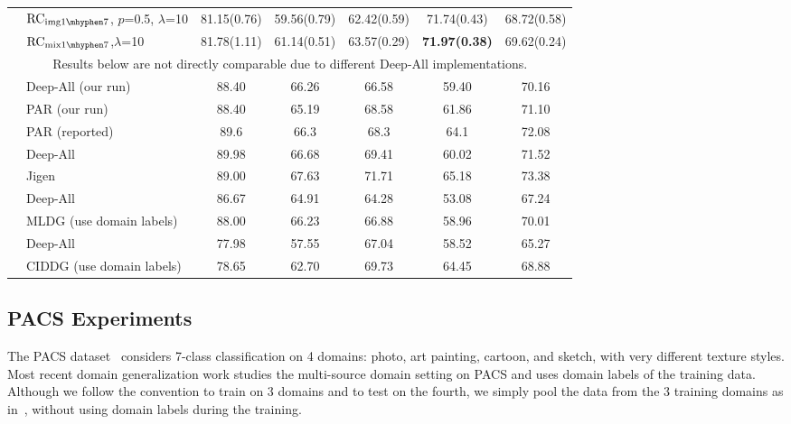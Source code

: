 \documentclass{article} \usepackage{iclr2021_conference,times}
\begin{document}
\begin{table}[t]
\begin{tabular}{c|lccccc}
		&$\text{RC}_{\text{img}{1\mhyphen7}}$\tiny, $p$=0.5, $\lambda$=10  & 81.15\tiny(0.76) & 59.56\tiny(0.79) & 62.42\tiny(0.59) & 71.74\tiny(0.43) & 68.72\tiny(0.58) \\	
		
		&$\text{RC}_{\text{mix}{1\mhyphen7}}$\tiny,$\lambda$=10 & 81.78\tiny(1.11) & 61.14\tiny(0.51) & 63.57\tiny(0.29) & \textbf{71.97\tiny(0.38)} & 69.62\tiny(0.24) \\

		
\midrule
		\multicolumn{7}{c}{{Results below are not directly comparable due to different Deep-All implementations.}} \\
		\midrule
		\multirow{3}{*}{\scriptsize	\citet{wang2019learning}} & Deep-All (our run) & 88.40 & 66.26 & 66.58 & 59.40 & 70.16 \\
		& PAR (our run) & 88.40 & 65.19 & 68.58  & 61.86 & 71.10 \\
		& PAR (reported) & 89.6 & 66.3 & 68.3 & 64.1 & 72.08 \\
\midrule
		\multirow{2}{*}{\scriptsize\citet{carlucci2019jigen}} & Deep-All & 89.98 & 66.68 & 69.41 & 60.02  & 71.52 \\
		& Jigen & 89.00 & 67.63& 71.71& 65.18 & 73.38 \\


		\midrule
		\multirow{2}{*}{\scriptsize\citet{li2018mldg}} & Deep-All &  86.67 & 64.91 & 64.28 & 53.08  & 67.24 \\
		& MLDG (\tiny use domain labels) & 88.00& 66.23 & 66.88 & 58.96  & 70.01 \\
\midrule
		\multirow{2}{*}{\scriptsize\citet{li2018ciddg}} & Deep-All& 77.98  &  57.55  & 67.04  & 58.52  & 65.27 \\
		& CIDDG (\tiny use domain labels)& 78.65 & 62.70 & 69.73 & 64.45  & 68.88 \\
		\bottomrule
	\end{tabular}
\end{table}

\subsection{PACS Experiments}

\label{section:PACS}
The PACS dataset~\citep{li2018domain} considers 7-class classification on 4 domains: photo, art painting, cartoon, and sketch, with very different texture styles. Most recent domain generalization work studies the multi-source domain setting on PACS and uses domain labels of the training data. Although we follow the convention to train on 3 domains and to test on the fourth, we simply pool the data from the 3 training domains as in~\citep{wang2019learning}, without using domain labels during the training. 
\end{document}
